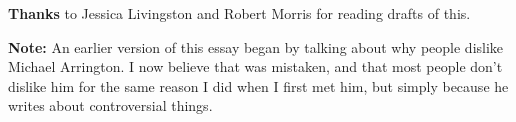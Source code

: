 \textbf{Thanks} to Jessica Livingston and Robert Morris for reading
drafts of this.

\textbf{Note:} An earlier version of this essay began by talking about
why people dislike Michael Arrington. I now believe that was mistaken,
and that most people don't dislike him for the same reason I did when I
first met him, but simply because he writes about controversial things.